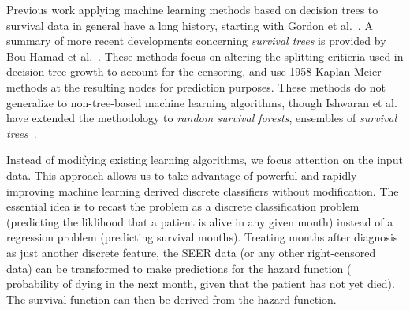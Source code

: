 \documentclass[10pt,letterpaper]{article}
\begin{document}


Previous work applying machine learning methods based on decision trees to survival data in general have a long history, starting with Gordon et al.~\cite{Gordon19851065}. A summary of more recent developments concerning \emph{survival trees} is provided by Bou-Hamad et al.~\cite{Bou-Hamad201144}. These methods focus on altering the splitting critieria used in decision tree growth to account for the censoring, and use 1958 Kaplan-Meier methods at the resulting nodes for prediction purposes. These methods do not generalize to non-tree-based machine learning algorithms, though Ishwaran et al. have extended the methodology to \emph{random survival forests}, ensembles of \emph{survival trees}~\cite{Ishwaran20101056}.



 Instead of modifying existing learning algorithms, we focus attention on the input data. This approach allows us to take advantage of powerful and rapidly improving machine learning derived discrete classifiers without modification. 
 The essential idea is to recast the problem as a discrete classification problem (predicting the liklihood that a patient is alive in any given month) instead of a regression problem (predicting survival months). Treating months after diagnosis as just another discrete feature, the SEER data (or any other right-censored data) can be transformed to make predictions for the hazard function (
 probability of dying in the next month, given that the patient has not yet died).
The survival function can then be derived from the hazard function.
\end{document}
